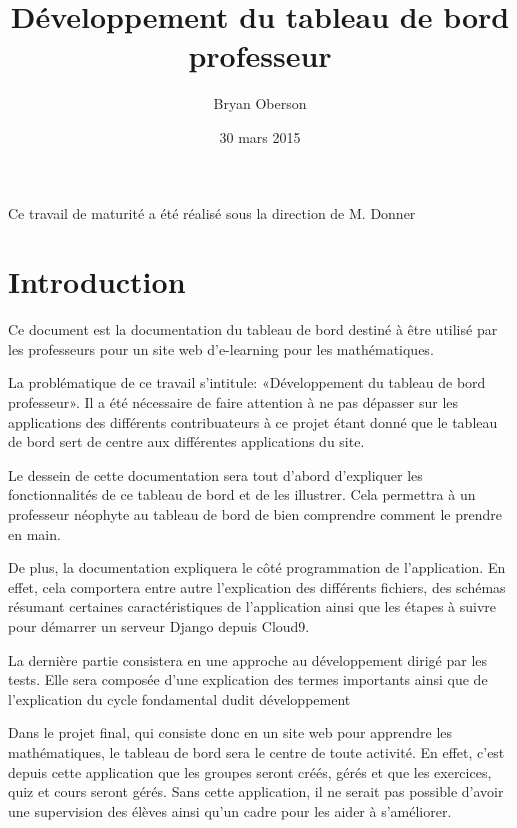 \documentclass[a4paper,10pt,french]{sphinxmanual}
\title{Développement du tableau de bord professeur}
\date{30 mars 2015}
\author{Bryan Oberson}
\begin{document}
\maketitle
\tableofcontents
{}\label{index::doc}\begin{center}
Ce travail de maturité a été réalisé sous la direction de M. Donner
\end{center}

\setcounter{page}{1}

\chapter{Introduction}
\label{intro:introduction}\label{intro::doc}\label{intro:developpement-du-tableau-de-bord-professeur}
Ce document est la documentation du tableau de bord destiné à
être utilisé par les professeurs pour un site web d'e-learning pour les
mathématiques.

La problématique de ce travail s'intitule: «Développement du tableau de bord
professeur». Il a été nécessaire de faire attention à ne pas dépasser sur les
applications des différents contribuateurs à ce projet étant donné que le
tableau de bord sert de centre aux différentes applications du site.

Le dessein de cette documentation sera tout d'abord d'expliquer les
fonctionnalités de ce tableau de bord et de les illustrer. Cela permettra à un
professeur néophyte au tableau de bord de bien comprendre comment le prendre en
main.

De plus, la documentation expliquera le côté programmation de l'application.
En effet, cela comportera entre autre l'explication des différents fichiers, des
schémas résumant certaines caractéristiques de l'application ainsi que les
étapes à suivre pour démarrer un serveur Django depuis Cloud9.

La dernière partie consistera en une approche au développement dirigé par les
tests. Elle sera composée d'une explication des termes importants ainsi que de
l'explication du cycle fondamental dudit développement

Dans le projet final, qui consiste donc en un site web pour apprendre les
mathématiques, le tableau de bord sera le centre de toute activité. En effet,
c'est depuis cette application que les groupes seront créés, gérés et que les
exercices, quiz et cours seront gérés. Sans cette application, il ne serait
pas possible d'avoir une supervision des élèves ainsi qu'un cadre pour les aider
à s'améliorer.
\end{document}
